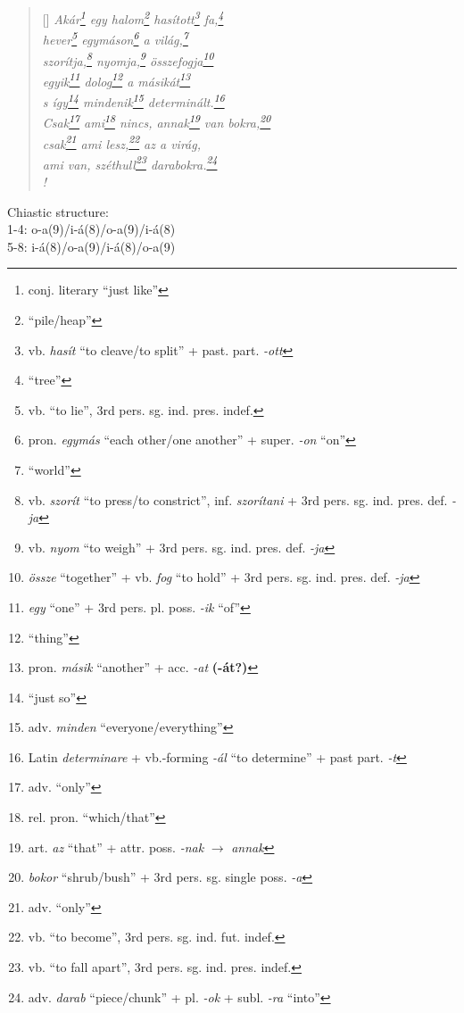 \documentclass[a4paper,12pt,twoside,final]{book}
\begin{document}
\begin{verse}[\versewidth]
  \it
  Akár\footnote{conj. literary ``just like''} egy
  halom\footnote{``pile/heap''} hasított\footnote{vb.
  \emph{hasít} ``to cleave/to split'' +
  past. part. \emph{-ott} } fa,\footnote{``tree''} \\
  hever\footnote{vb. ``to lie'', 3rd pers. sg. ind. pres. indef.}
  egymáson\footnote{pron. \emph{egymás} ``each other/one
  another'' + super. \emph{-on} ``on''} a világ,\footnote{``world''} \\
  szorítja,\footnote{vb. \emph{szorít} ``to press/to
  constrict'', inf. \emph{szorítani} + 3rd
  pers. sg. ind. pres. def. \emph{-ja}} nyomja,\footnote{vb.
  \emph{nyom} ``to weigh'' + 3rd pers. sg. ind. pres. def. \emph{-ja}}
  összefogja\footnote{\emph{össze} ``together'' + vb. \emph{fog}
  ``to hold'' + 3rd pers. sg. ind. pres. def. \emph{-ja}} \\
  egyik\footnote{\emph{egy} ``one'' + 3rd
  pers. pl. poss. \emph{-ik} ``of'' } dolog\footnote{``thing''} a
  másikát\footnote{pron. \emph{másik} ``another'' +
  acc. \emph{-at} \textbf{(-át?)}} \\
  s így\footnote{``just so''} mindenik\footnote{adv. \emph{minden}
  ``everyone/everything''} determinált.\footnote{Latin \emph{determinare} +
  vb.-forming \emph{-ál} ``to determine'' + past part. \emph{-t}} \\
  Csak\footnote{adv. ``only''} ami\footnote{rel. pron. ``which/that''} nincs,
  annak\footnote{art. \emph{az} ``that'' + attr. poss. \emph{-nak}
  $\rightarrow$ \emph{annak}}
  van bokra,\footnote{\emph{bokor} ``shrub/bush'' + 3rd
  pers. sg. single poss. \emph{-a}} \\
  csak\footnote{adv. ``only''} ami lesz,\footnote{vb. ``to
  become'', 3rd pers. sg. ind. fut. indef.} az a virág, \\
  ami van, széthull\footnote{vb. ``to fall apart'',
  3rd pers. sg. ind. pres. indef.}
  darabokra.\footnote{adv. \emph{darab} ``piece/chunk'' +
  pl. \emph{-ok} + subl. \emph{-ra} ``into''} \\!
\end{verse}

\noindent Chiastic structure: \\
1-4: o-a(9)/i-á(8)/o-a(9)/i-á(8) \\
5-8: i-á(8)/o-a(9)/i-á(8)/o-a(9)

\newpage


\settowidth{\versewidth}{stubbornly leaping at the bright, dewy coal.}
\end{document}
